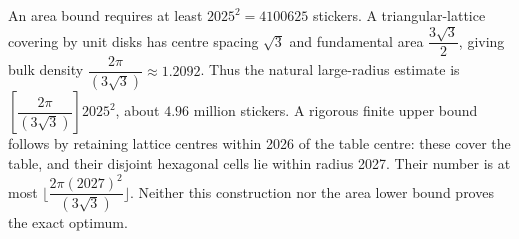An area bound requires at least $2025^2=4100625$ stickers. A triangular-lattice covering by unit disks has centre spacing $\sqrt3$ and fundamental area $\dfrac{3\sqrt3}{2}$, giving bulk density $\dfrac{2\pi}{(3\sqrt3)}\approx1.2092$. Thus the natural large-radius estimate is $[\dfrac{2\pi}{(3\sqrt3)}]2025^2$, about $4.96$ million stickers. A rigorous finite upper bound follows by retaining lattice centres within 2026 of the table centre: these cover the table, and their disjoint hexagonal cells lie within radius 2027. Their number is at most $\lfloor\dfrac{2\pi(2027)^2}{(3\sqrt3)}\rfloor$. Neither this construction nor the area lower bound proves the exact optimum.

